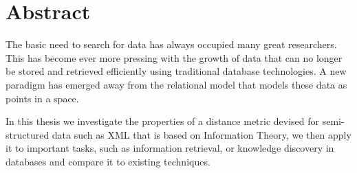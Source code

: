 \begingroup
\let\clearpage\relax
\let\cleardoublepage\relax
\let\cleardoublepage\relax

\chapter*{Abstract}
The basic need to search for data has always occupied many great researchers.  This has become ever more pressing with the growth of data that can no longer be stored and retrieved efficiently using traditional database technologies.  A new paradigm has emerged away from the relational model that models these data as points in a space.

In this thesis we investigate the properties of a distance metric devised for semi-structured data such as XML that is based on Information Theory, we then apply it to important tasks, such as information retrieval, or knowledge discovery in databases and compare it to existing techniques.
\endgroup			

\vfill